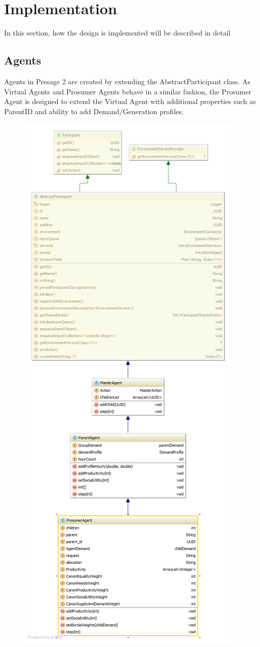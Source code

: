 \chapter{Implementation}
\label{Implementation}
In this section, how the design is implemented will be described in detail

\section*{Agents}
Agents in Presage 2 are created by extending the AbstractParticipant class. As Virtual Agents and Prosumer Agents behave in a similar fashion, the Prosumer Agent is designed to extend the Virtual Agent with additional properties such as ParentID and ability to add Demand/Generation profiles.

\begin{figure}[!h]
	\centering
	\includegraphics[scale=0.4]{Images/AgentUML.png}

\end{figure}
